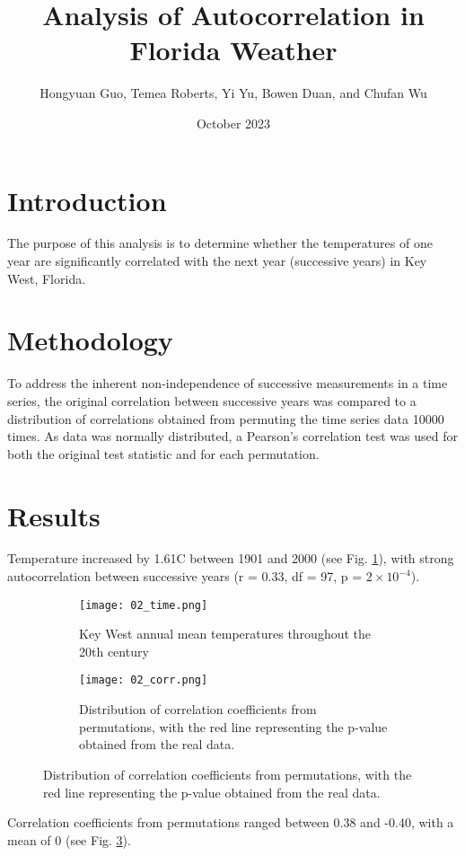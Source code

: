 \documentclass[12pt,a4paper]{article}
\title{Analysis of Autocorrelation in Florida Weather}
\author{Hongyuan Guo, Temea Roberts, Yi Yu, Bowen Duan, and Chufan Wu}
\date{October 2023}
\begin{document}
\maketitle

\section{Introduction}
The purpose of this analysis is to determine whether the temperatures of one year are significantly correlated with the next year (successive years) in Key West, Florida.

\section{Methodology}
To address the inherent non-independence of successive measurements in a time series, the original correlation between successive years was compared to a distribution of correlations obtained from permuting the time series data 10000 times. As data was normally distributed, a Pearson's correlation test was used for both the original test statistic and for each permutation. 

\section{Results}
Temperature increased by 1.61\textdegree C between 1901 and 2000 (see Fig. \ref{fig:time}), with strong autocorrelation between successive years (r = 0.33, df = 97, p = \(2 \times 10^{-4}\)). 

\begin{figure}[h]
\centering
\begin{subfigure}{0.45\textwidth}
    \texttt{[image: 02\_time.png]}
    \caption{Key West annual mean temperatures throughout the 20th century}
    \label{fig:time}
\end{subfigure}
\hfill
\begin{subfigure}{0.45\textwidth}
    \texttt{[image: 02\_corr.png]}
    \caption{Distribution of correlation coefficients from permutations, with the red line representing the p-value obtained from the real data.}
    \label{fig:corr}
\end{subfigure}
\end{figure}

Correlation coefficients from permutations ranged between 0.38 and -0.40, with a mean of 0 (see Fig. \ref{fig:corr}).
\end{document}
